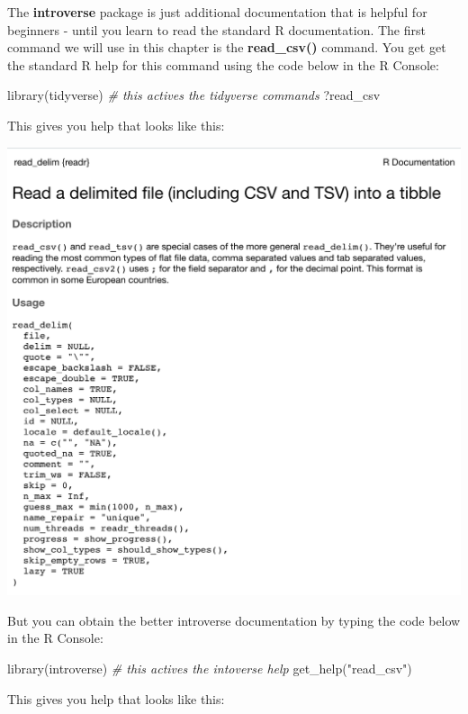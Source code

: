 \documentclass[
]{krantz}
\makeatletter
\newenvironment{Shaded}{\begin{snugshade}}{\end{snugshade}}
\newcommand{\CommentTok}[1]{\textcolor[rgb]{0.37,0.37,0.37}{\textit{#1}}}
\newcommand{\FunctionTok}[1]{\textcolor[rgb]{0,0,0}{#1}}
\newcommand{\NormalTok}[1]{#1}
\newcommand{\StringTok}[1]{\textcolor[rgb]{0.5,0.5,0.5}{#1}}
\newenvironment{kframe}{%
\medskip{}
\setlength{\fboxsep}{.8em}
 \def\at@end@of@kframe{}%
 \ifinner\ifhmode%
  \def\at@end@of@kframe{\end{minipage}}%
  \begin{minipage}{\columnwidth}%
 \fi\fi%
 \def\FrameCommand##1{\hskip\@totalleftmargin \hskip-\fboxsep
 \colorbox{shadecolor}{##1}\hskip-\fboxsep
     \hskip-\linewidth \hskip-\@totalleftmargin \hskip\columnwidth}%
 \MakeFramed {\advance\hsize-\width
   \@totalleftmargin\z@ \linewidth\hsize
   \@setminipage}}%
 {\par\unskip\endMakeFramed%
 \at@end@of@kframe}
\renewenvironment{Shaded}{\begin{kframe}}{\end{kframe}}
\makeatother
\begin{document}
The \textbf{introverse} package is just additional documentation that is helpful for beginners - until you learn to read the standard R documentation. The first command we will use in this chapter is the \textbf{read\_csv()} command. You get get the standard R help for this command using the code below in the R Console:

\begin{Shaded}
\begin{Highlighting}[]
\FunctionTok{library}\NormalTok{(tidyverse) }\CommentTok{\# this actives the tidyverse commands}
\NormalTok{?read\_csv}
\end{Highlighting}
\end{Shaded}

This gives you help that looks like this:

\includegraphics[width=0.7\linewidth]{ch_tidy_intro/images/screenshot_R_help}

But you can obtain the better introverse documentation by typing the code below in the R Console:

\begin{Shaded}
\begin{Highlighting}[]
\FunctionTok{library}\NormalTok{(introverse) }\CommentTok{\# this actives the intoverse help}
\FunctionTok{get\_help}\NormalTok{(}\StringTok{"read\_csv"}\NormalTok{)}
\end{Highlighting}
\end{Shaded}

This gives you help that looks like this:
\end{document}
